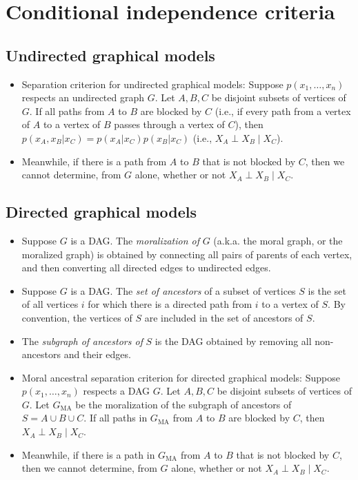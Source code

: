 \documentclass[12pt]{article}
\begin{document}
\section{Conditional independence criteria}

\subsection{Undirected graphical models}
\begin{itemize}
\item Separation criterion for undirected graphical models: Suppose $p(x_1,\ldots,x_n)$ respects an undirected graph $G$. Let $A,B,C$ be disjoint subsets of vertices of $G$. If all paths from $A$ to $B$ are blocked by $C$ (i.e., if every path from a vertex of $A$ to a vertex of $B$ passes through a vertex of $C$), then $p(x_A,x_B |x_C)= p(x_A | x_C) p(x_B | x_C)$ (i.e., $X_A \perp X_B \mid X_C$).
\item Meanwhile, if there is a path from $A$ to $B$ that is not blocked by $C$, then we cannot determine, from $G$ alone, whether or not $X_A \perp X_B \mid X_C$.
\end{itemize}

\subsection{Directed graphical models}
\begin{itemize}
\item Suppose $G$ is a DAG. The \textit{moralization of} $G$ (a.k.a. the moral graph, or the moralized graph) is obtained by connecting all pairs of parents of each vertex, and then converting all directed edges to undirected edges.
\item Suppose $G$ is a DAG. The \textit{set of ancestors}  of a subset of vertices $S$ is the set of all vertices $i$ for which there is a directed path from $i$ to a vertex of $S$. By convention, the vertices of $S$ are included in the set of ancestors of $S$.
\item The \textit{subgraph of ancestors of} $S$ is the DAG obtained by removing all non-ancestors and their edges.
\item Moral ancestral separation criterion for directed graphical models: Suppose $p(x_1,\ldots,x_n)$ respects a DAG $G$. Let $A,B,C$ be disjoint subsets of vertices of $G$. Let $G_\text{MA}$ be the moralization of the subgraph of ancestors of $S = A \cup B \cup C$. If all paths in $G_\text{MA}$ from $A$ to $B$ are blocked by $C$, then $X_A \perp X_B \mid X_C$.
\item Meanwhile, if there is a path  in $G_\text{MA}$ from $A$ to $B$ that is not blocked by $C$, then we cannot determine, from $G$ alone, whether or not $X_A \perp X_B \mid X_C$.
\end{itemize}
\end{document}
